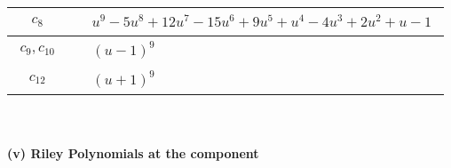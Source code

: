 \documentclass[1p]{elsarticle_modified}
\theoremstyle{definition}
\begin{document}
\begin{tabular}{m{50pt}|m{274pt}}
\hline $$\begin{aligned}c_{8}\end{aligned}$$&$\begin{aligned}
&u^9-5 u^8+12 u^7-15 u^6+9 u^5+u^4-4 u^3+2 u^2+u-1
\end{aligned}$\\
\hline $$\begin{aligned}c_{9},c_{10}\end{aligned}$$&$\begin{aligned}
&(u-1)^9
\end{aligned}$\\
\hline $$\begin{aligned}c_{12}\end{aligned}$$&$\begin{aligned}
&(u+1)^9
\end{aligned}$\\
\hline
\end{tabular}\\~\\
\newpage\renewcommand{\arraystretch}{1}
\flushleft \textbf{(v) Riley Polynomials at the component}\newline \\
\end{document}
